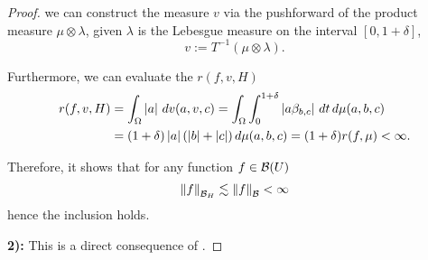 \begin{proof}
 we can construct the measure $v$ via the pushforward of the product measure
$\mu\otimes\lambda$, given $\lambda$ is the Lebesgue measure on the interval
$[0,1+\delta]$,
\begin{equation}
    v := T^{-1}(\mu\otimes\lambda).
\end{equation}

Furthermore, we can evaluate the $r(f, v, H)$
\begin{align}
    r(f, v, H) 
    &= \int_{\Omega} \left| a \right| \,dv(a,v,c) 
    = \int_{\Omega}\int_0^{1+\delta} \left| a\beta_{b,c} \right| \,dt\,d\mu(a,b,c) \\
    &= (1+\delta) \left| a \right|(\left| b \right| + \left| c \right|) \,d\mu(a,b,c)
    = (1+\delta) r(f,\mu) < \infty.
\end{align}

Therefore, it shows that for any function $f \in \mathcal{B}(U)$
\begin{equation}
    \left\| f \right\|_{\mathcal{B}_H} \lesssim \left\| f \right\|_{\mathcal{B}} < \infty
\end{equation}
hence the inclusion holds.

\textbf{2):} This is a direct consequence of \cite[Theorem
2]{barronNeuralNetApproximation1992}.






\end{proof}
